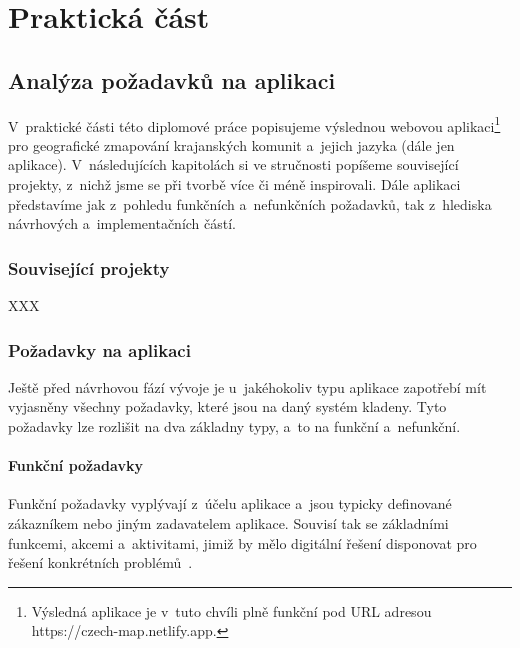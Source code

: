 \part{Praktická část}

\hypertarget{analuxfdza-poux17eadavkux16f-na-aplikaci}{%
\chapter{Analýza požadavků na aplikaci}\label{analuxfdza-poux17eadavkux16f-na-aplikaci}}

V~praktické části této diplomové práce popisujeme výslednou webovou aplikaci\footnote{Výsledná aplikace je v~tuto chvíli plně funkční pod URL adresou https://czech-map.netlify.app.} pro geografické zmapování krajanských komunit a~jejich jazyka (dále jen aplikace). V~následujících kapitolách si ve stručnosti popíšeme související projekty, z~nichž jsme se při tvorbě více či méně inspirovali. Dále aplikaci představíme jak z~pohledu funkčních a~nefunkčních požadavků, tak z~hlediska návrhových a~implementačních částí.

\hypertarget{souvisejuxedcuxed-projekty}{%
\section{Související projekty}\label{souvisejuxedcuxed-projekty}}

XXX

\hypertarget{poux17eadavky-na-aplikaci}{%
\section{Požadavky na aplikaci}\label{poux17eadavky-na-aplikaci}}

Ještě před návrhovou fází vývoje je u~jakéhokoliv typu aplikace zapotřebí mít vyjasněny všechny požadavky, které jsou na daný systém kladeny. Tyto požadavky lze rozlišit na dva základny typy, a~to na funkční a~nefunkční.

\hypertarget{funkux10dnuxed-poux17eadavky}{%
\subsection{Funkční požadavky}\label{funkux10dnuxed-poux17eadavky}}

Funkční požadavky vyplývají z~účelu aplikace a~jsou typicky definované zákazníkem nebo jiným zadavatelem aplikace. Souvisí tak se základními funkcemi, akcemi a~aktivitami, jimiž by mělo digitální řešení disponovat pro řešení konkrétních problémů~\parencite{Gorton2006}.

